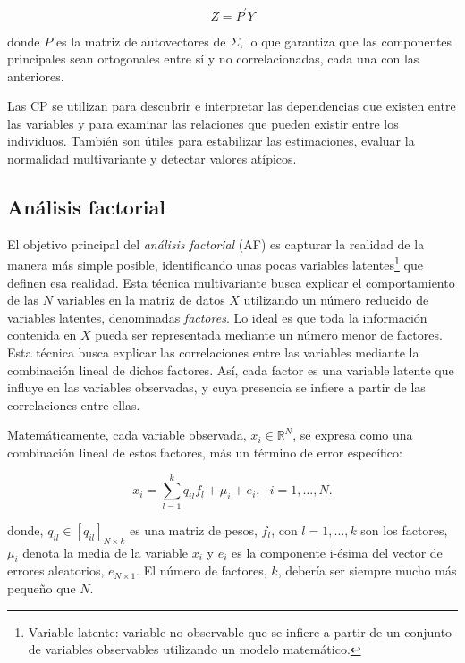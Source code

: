 \[
Z=P^{'}Y
\]

donde $P$ es la matriz de autovectores de $\Sigma$, lo que garantiza que las componentes principales sean ortogonales entre sí y no 
correlacionadas, cada una con las anteriores. \newline

Las CP se utilizan para descubrir e interpretar las dependencias que existen entre las variables y para examinar las relaciones
que pueden existir entre los individuos. También son útiles para estabilizar las estimaciones, evaluar la normalidad
multivariante y detectar valores atípicos. \newline


\subsection{Análisis factorial}

El objetivo principal del \textit{análisis factorial} (AF) es capturar la realidad de la manera más simple posible, identificando 
unas pocas variables latentes\footnote[8]{Variable latente: variable no observable que se infiere a partir de un conjunto de variables 
observables utilizando un modelo matemático. } que definen esa realidad. Esta técnica multivariante busca explicar el comportamiento de las $N$ 
variables en la matriz de datos $X$ utilizando un número reducido de variables latentes, denominadas \textit{factores}. Lo ideal es que toda 
la información contenida en $X$ pueda ser representada mediante un número menor de factores. Esta técnica busca explicar las correlaciones 
entre las variables mediante la combinación lineal de dichos factores. Así, cada factor es una variable latente que 
influye en las variables observadas, y cuya presencia se infiere a partir de las correlaciones entre ellas. \newline

Matemáticamente, cada variable observada, $x_{i}\in \mathbb{R}^{N}$, 
se expresa como una combinación lineal de estos factores, más un término de error específico:

\[
x_{i} = \sum_{l=1}^{k}q_{il}f_{l} + \mu_{i} + e_{i}, \text{ } i=1,\dots,N.
\]

donde, $q_{il} \in [q_{il}]_{N \times k}$ es una matriz de pesos, $f_{l}$, con $l=1,\dots,k$ son los factores, $\mu_{i}$ denota la media de la variable
$x_{i}$ y $e_{i}$ es la componente i-ésima del vector de errores aleatorios, $e_{N\times 1}$. El número de factores, $k$, debería ser siempre mucho más pequeño que $N$. \newline

